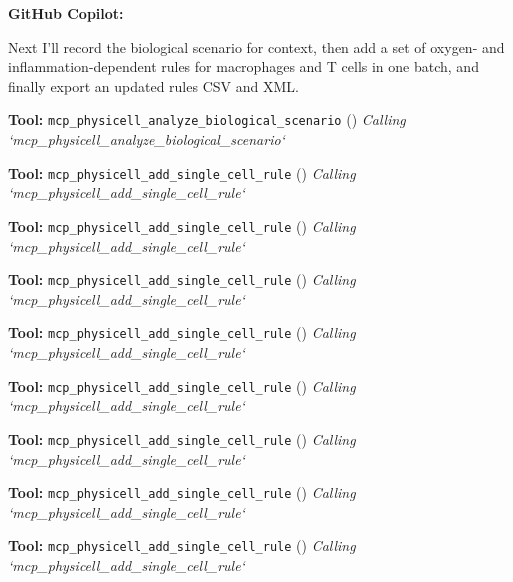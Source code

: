 \documentclass[11pt,a4paper]{article}
\begin{document}
\begin{copilotbox}
\textbf{GitHub Copilot:}

Next I’ll record the biological scenario for context, then add a set of oxygen- and inflammation-dependent rules for macrophages and T cells in one batch, and finally export an updated rules CSV and XML.

\end{copilotbox}
\begin{toolokbox}
\textbf{Tool:} \texttt{mcp\_physicell\_analyze\_biological\_scenario} (\checkmark)
\textit{Calling `mcp\_physicell\_analyze\_biological\_scenario`}
\end{toolokbox}
\begin{toolokbox}
\textbf{Tool:} \texttt{mcp\_physicell\_add\_single\_cell\_rule} (\checkmark)
\textit{Calling `mcp\_physicell\_add\_single\_cell\_rule`}
\end{toolokbox}
\begin{toolokbox}
\textbf{Tool:} \texttt{mcp\_physicell\_add\_single\_cell\_rule} (\checkmark)
\textit{Calling `mcp\_physicell\_add\_single\_cell\_rule`}
\end{toolokbox}
\begin{toolokbox}
\textbf{Tool:} \texttt{mcp\_physicell\_add\_single\_cell\_rule} (\checkmark)
\textit{Calling `mcp\_physicell\_add\_single\_cell\_rule`}
\end{toolokbox}
\begin{toolokbox}
\textbf{Tool:} \texttt{mcp\_physicell\_add\_single\_cell\_rule} (\checkmark)
\textit{Calling `mcp\_physicell\_add\_single\_cell\_rule`}
\end{toolokbox}
\begin{toolokbox}
\textbf{Tool:} \texttt{mcp\_physicell\_add\_single\_cell\_rule} (\checkmark)
\textit{Calling `mcp\_physicell\_add\_single\_cell\_rule`}
\end{toolokbox}
\begin{toolokbox}
\textbf{Tool:} \texttt{mcp\_physicell\_add\_single\_cell\_rule} (\checkmark)
\textit{Calling `mcp\_physicell\_add\_single\_cell\_rule`}
\end{toolokbox}
\begin{toolokbox}
\textbf{Tool:} \texttt{mcp\_physicell\_add\_single\_cell\_rule} (\checkmark)
\textit{Calling `mcp\_physicell\_add\_single\_cell\_rule`}
\end{toolokbox}
\begin{toolokbox}
\textbf{Tool:} \texttt{mcp\_physicell\_add\_single\_cell\_rule} (\checkmark)
\textit{Calling `mcp\_physicell\_add\_single\_cell\_rule`}
\end{toolokbox}
\end{document}
